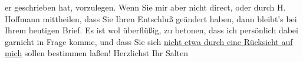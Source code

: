 \begin{ledgroupsized}[t]{13cm}
               er geschrieben hat, vorzulegen. Wenn Sie mir aber nicht direct, oder durch H. Hoffmann mittheilen, dass Sie Ihren Entschluß
               geändert haben, dann bleibt’s bei Ihrem heutigen Brief. \pend
           \pstart
           Es ist wol überflüßig, zu betonen, dass ich persönlich dabei garnicht in Frage komme,
               und dass Sie sich \uline{nicht etwa durch eine Rücksicht auf
                  mich} sollen bestimmen laßen! \pend
           \pstart Herzlichst Ihr \spacefill\mbox{Salten }\pend{}
         
         \endnumbering{}\end{ledgroupsized}\begin{anhang}\end{anhang}\newcommand{\dateiname}{L03406}\newcommand{\titel}{Felix Salten an Arthur Schnitzler, 20. 1. 1905}\newcommand{\editorInnen}{Martin Anton Müller und Laura Untner}
      